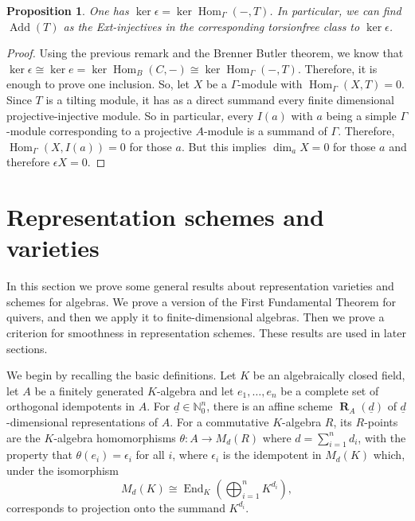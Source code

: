 \documentclass[11pt,a4paper]{amsart}
\theoremstyle{plain}
\newtheorem{pro}[thm]{Proposition}
\theoremstyle{definition}
\begin{document}
\begin{pro} 
One has $\operatorname{ker} \epsilon =\operatorname{ker} \operatorname{Hom}_{\Gamma} (- ,T) $.
In particular, we can find $\operatorname{Add} (T)$ as the Ext-injectives in the corresponding torsionfree class to $\operatorname{ker} \epsilon$.  
\end{pro}

\begin{proof}
Using the previous remark and the Brenner Butler theorem, we know that $\operatorname{ker} \epsilon \cong \operatorname{ker} {e} =\operatorname{ker} \operatorname{Hom}_B(C,-)\cong \operatorname{ker} \operatorname{Hom}_{\Gamma} (- ,T)$. Therefore, 
it is enough to prove one inclusion. So, let $X$ be a $\Gamma$-module with 
$\operatorname{Hom}_{\Gamma }(X, T)=0$. Since $T$ is a tilting module, it has as a direct summand every finite dimensional projective-injective module. So in particular, every $I(a)$ with $a$ being a simple $\Gamma$-module corresponding to a projective $A$-module is a summand of $\Gamma$. Therefore, $\operatorname{Hom}_{\Gamma}(X, I(a))=0$ for those $a$. But this implies 
$\dim_a X=0$ for those $a$ and therefore $\epsilon X=0$. 
\end{proof}

\section{Representation schemes and varieties}
In this section we prove some general results about representation varieties and schemes for algebras.
We prove a version of the First Fundamental Theorem for quivers, and then we apply it to finite-dimensional algebras. Then we prove a criterion for smoothness in representation schemes. These results are used in later sections.

We begin by recalling the basic definitions.
Let $K$ be an algebraically closed field, let $A$ be a finitely generated $K$-algebra
and let $e_1,\dots,e_n$ be a complete set of orthogonal idempotents in $A$.
For ${\underline{d}}\in {\mathbb{N}}_0^n$, there is an affine scheme ${\operatorname{\mathbf{R}}_A(\underline{d})}$ of ${\underline{d}}$-dimensional representations 
of $A$.
For a commutative $K$-algebra $R$, its $R$-points are the $K$-algebra homomorphisms 
$\theta:A\to M_d(R)$
where $d = \sum_{i=1}^n d_i$, with the property that $\theta(e_i) = \epsilon_i$ for all $i$, 
where $\epsilon_i$ is the idempotent in
$M_d(K)$ which, under the isomorphism
\[
M_d(K) \cong \operatorname{End}_K(\bigoplus_{i=1}^n K^{d_i}),
\]
corresponds to projection onto the summand $K^{d_i}$.
\end{document}
